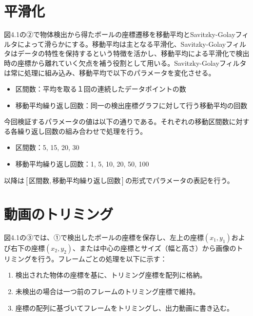 \documentclass[11pt,a4j]{jreport}
\begin{document}
\section{平滑化}
図4.1の②で物体検出から得たボールの座標遷移を移動平均とSavitzky-Golayフィルタによって滑らかにする。移動平均は主となる平滑化、Savitzky-Golayフィルタはデータの特性を保持するという特徴を活かし、移動平均による平滑化で検出時の座標から離れていく欠点を補う役割として用いる。Savitzky-Golayフィルタは常に処理に組み込み、移動平均で以下のパラメータを変化させる。

\begin{itemize}
    \item 区間数：平均を取る１回の連続したデータポイントの数
    \item 移動平均繰り返し回数：同一の検出座標グラフに対して行う移動平均の回数
\end{itemize}

\noindent
今回検証するパラメータの値は以下の通りである。それぞれの移動区間数に対する各繰り返し回数の組み合わせで処理を行う。
\begin{itemize}
    \item 区間数：5, 15, 20, 30
    \item 移動平均繰り返し回数：1, 5, 10, 20, 50, 100
\end{itemize}

\noindent
以降は$[\text{区間数}, \text{移動平均繰り返し回数}]$の形式でパラメータの表記を行う。

\section{動画のトリミング}
図4.1の③では、①で検出したボールの座標を保存し、左上の座標$(x_1, y_1)$および右下の座標$(x_2, y_2)$、または中心の座標とサイズ（幅と高さ）から画像のトリミングを行う。フレームごとの処理を以下に示す：\\

\begin{enumerate}
    \item 検出された物体の座標を基に、トリミング座標を配列に格納。
    \item 未検出の場合は一つ前のフレームのトリミング座標で維持。
    \item 座標の配列に基づいてフレームをトリミングし、出力動画に書き込む。\\
\end{enumerate}
\end{document}
